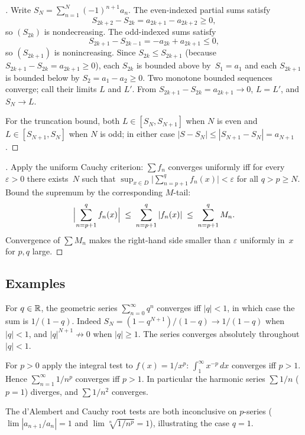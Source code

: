 \begin{proof}[]
Write $S_N = \sum_{n=1}^{N} (-1)^{n+1} a_n$. The even-indexed
partial sums satisfy
\[
  S_{2k+2} - S_{2k} = a_{2k+1} - a_{2k+2} \ge 0,
\]
so $(S_{2k})$ is nondecreasing. The odd-indexed sums satisfy
\[
  S_{2k+1} - S_{2k-1} = -a_{2k} + a_{2k+1} \le 0,
\]
so $(S_{2k+1})$ is nonincreasing. Since $S_{2k} \le S_{2k+1}$ (because
$S_{2k+1} - S_{2k} = a_{2k+1} \ge 0$), each $S_{2k}$ is bounded above
by~$S_1 = a_1$ and each $S_{2k+1}$ is bounded below by $S_2 = a_1 - a_2 \ge 0$.
Two monotone bounded sequences converge; call their limits
$L$ and $L'$. From $S_{2k+1} - S_{2k} = a_{2k+1} \to 0$, $L = L'$, and
$S_N \to L$.

For the truncation bound, both $L \in [S_{N}, S_{N+1}]$ when $N$ is
even and $L \in [S_{N+1}, S_N]$ when $N$ is odd; in either case
$|S - S_N| \le |S_{N+1} - S_N| = a_{N+1}$.
\end{proof}

\begin{proof}[]
Apply the uniform Cauchy criterion: $\sum f_n$ converges uniformly
iff for every $\varepsilon > 0$ there exists~$N$ such that
$\sup_{x \in D} \bigl|\sum_{n=p+1}^{q} f_n(x)\bigr| < \varepsilon$
for all $q > p \ge N$. Bound the supremum by the corresponding
$M$-tail:
\[
  \Bigl| \sum_{n=p+1}^{q} f_n(x) \Bigr|
  \;\le\; \sum_{n=p+1}^{q} |f_n(x)|
  \;\le\; \sum_{n=p+1}^{q} M_n.
\]
Convergence of $\sum M_n$ makes the right-hand side smaller than
$\varepsilon$ uniformly in~$x$ for $p, q$ large.
\end{proof}

\subsection*{Examples}

\begin{example}
\label{ex:geometric}
For $q \in \mathbb{R}$, the geometric series $\sum_{n=0}^{\infty} q^n$
converges iff $|q| < 1$, in which case the sum is $1/(1 - q)$. Indeed
$S_N = (1 - q^{N+1})/(1 - q) \to 1/(1 - q)$ when $|q| < 1$, and
$|q|^{N+1} \not\to 0$ when $|q| \ge 1$. The series converges
absolutely throughout $|q| < 1$.
\end{example}

\begin{example}
\label{ex:p-series}
For $p > 0$ apply the integral test to $f(x) = 1/x^p$:
$\int_1^{\infty} x^{-p}\, dx$ converges iff $p > 1$. Hence
$\sum_{n=1}^{\infty} 1/n^p$ converges iff $p > 1$. In particular the
harmonic series $\sum 1/n$ ($p = 1$) diverges, and $\sum 1/n^2$
converges.

The d'Alembert and Cauchy root tests are both inconclusive on
$p$-series ($\lim |a_{n+1}/a_n| = 1$ and
$\lim \sqrt[n]{1/n^p} = 1$), illustrating the case $q = 1$.
\end{example}

